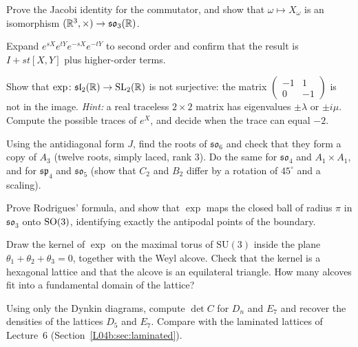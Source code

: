 \begin{exercise}
Prove the Jacobi identity for the commutator, and show that $\omega\mapsto X_\omega$ is an isomorphism
$(\mathbb{R}^3,\times)\to\mathfrak{so}_3(\mathbb{R})$.
\end{exercise}

\begin{exercise}
Expand $e^{sX}e^{tY}e^{-sX}e^{-tY}$ to second order and confirm that the result is $I+st[X,Y]$ plus
higher-order terms.
\end{exercise}

\begin{exercise}
Show that $\exp\colon\mathfrak{sl}_2(\mathbb{R})\to\mathrm{SL}_2(\mathbb{R})$ is not surjective: the matrix
$\left(\begin{smallmatrix}-1&1\\0&-1\end{smallmatrix}\right)$ is not in the image. \emph{Hint:} a real
traceless $2\times2$ matrix has eigenvalues $\pm\lambda$ or $\pm i\mu$. Compute the possible traces of
$e^X$, and decide when the trace can equal $-2$.
\end{exercise}

\begin{exercise}
Using the antidiagonal form $J$, find the roots of $\mathfrak{so}_6$ and check that they form a copy of
$A_3$ (twelve roots, simply laced, rank $3$). Do the same for $\mathfrak{so}_4$ and $A_1\times A_1$, and for
$\mathfrak{sp}_4$ and $\mathfrak{so}_5$ (show that $C_2$ and $B_2$ differ by a rotation of $45^\circ$ and a scaling).
\end{exercise}

\begin{exercise}
Prove Rodrigues' formula, and show that $\exp$ maps the closed ball of radius $\pi$ in $\mathfrak{so}_3$
onto $\mathrm{SO}(3)$, identifying exactly the antipodal points of the boundary.
\end{exercise}

\begin{exercise}
Draw the kernel of $\exp$ on the maximal torus of $\mathrm{SU}(3)$ inside the plane
$\theta_1+\theta_2+\theta_3=0$, together with the Weyl alcove. Check that the kernel is a hexagonal
lattice and that the alcove is an equilateral triangle. How many alcoves fit into a fundamental domain
of the lattice?
\end{exercise}

\begin{exercise}
Using only the Dynkin diagrams, compute $\det C$ for $D_n$ and $E_7$ and recover the densities of the
lattices $D_5$ and $E_7$. Compare with the laminated lattices of Lecture~6
(Section~\ref{L04b:sec:laminated}).
\end{exercise}

